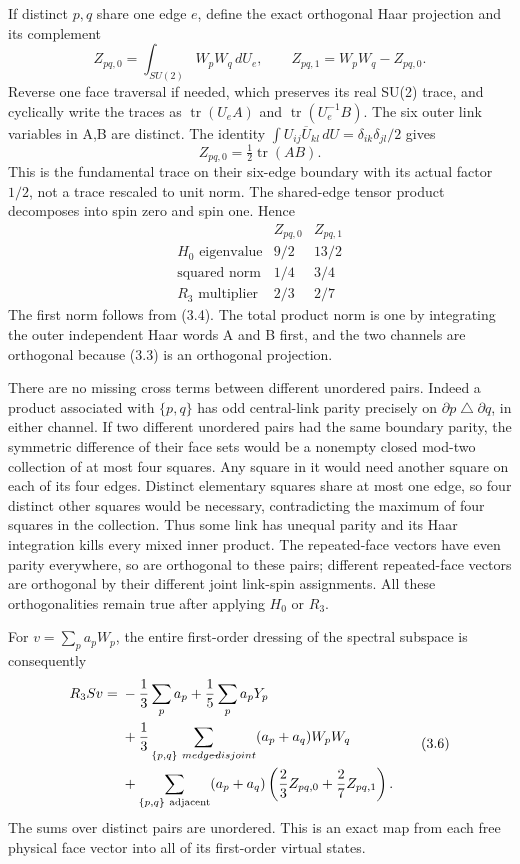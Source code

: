 \documentclass[
  11pt,
]{article}
\begin{document}
If distinct \(p,q\) share one edge \(e\), define the exact orthogonal
Haar projection and its complement \[
 Z_{pq,0}=\int_{SU(2)}W_pW_q\,dU_e,\qquad
 Z_{pq,1}=W_pW_q-Z_{pq,0}.
\tag{3.3}
\] Reverse one face traversal if needed, which preserves its real SU(2)
trace, and cyclically write the traces as \(\operatorname{tr}(U_eA)\)
and \(\operatorname{tr}(U_e^{-1}B)\). The six outer link variables in
A,B are distinct. The identity
\(\int U_{ij}\overline U_{kl}\,dU=\delta_{ik}\delta_{jl}/2\) gives \[
 Z_{pq,0}=\tfrac12\operatorname{tr}(AB).
\tag{3.4}
\] This is the fundamental trace on their six-edge boundary with its
actual factor \(1/2\), not a trace rescaled to unit norm. The
shared-edge tensor product decomposes into spin zero and spin one. Hence
\[
 \begin{array}{c|cc}
 &Z_{pq,0}&Z_{pq,1}\\ \hline
 H_0\text{ eigenvalue}&9/2&13/2\\
 \text{squared norm}&1/4&3/4\\
 R_3\text{ multiplier}&2/3&2/7
 \end{array}
\tag{3.5}
\] The first norm follows from (3.4). The total product norm is one by
integrating the outer independent Haar words A and B first, and the two
channels are orthogonal because (3.3) is an orthogonal projection.

There are no missing cross terms between different unordered pairs.
Indeed a product associated with \(\{p,q\}\) has odd central-link parity
precisely on \(\partial p\mathbin\triangle\partial q\), in either
channel. If two different unordered pairs had the same boundary parity,
the symmetric difference of their face sets would be a nonempty closed
mod-two collection of at most four squares. Any square in it would need
another square on each of its four edges. Distinct elementary squares
share at most one edge, so four distinct other squares would be
necessary, contradicting the maximum of four squares in the collection.
Thus some link has unequal parity and its Haar integration kills every
mixed inner product. The repeated-face vectors have even parity
everywhere, so are orthogonal to these pairs; different repeated-face
vectors are orthogonal by their different joint link-spin assignments.
All these orthogonalities remain true after applying \(H_0\) or \(R_3\).

For \(v=\sum_pa_pW_p\), the entire first-order dressing of the spectral
subspace is consequently \[
 \begin{split}
 R_3Sv={}&-\frac13\sum_pa_p
 +\frac15\sum_pa_pY_p\\
 &+\frac13\sum_{\{p,q\}\ {m edge\!\!-\!\!disjoint}}
                      (a_p+a_q)W_pW_q\\
 &+\sum_{\{p,q\}\ {\rm adjacent}}(a_p+a_q)
                  \left(\frac23Z_{pq,0}+\frac27Z_{pq,1}\right).
 \end{split}
\tag{3.6}
\] The sums over distinct pairs are unordered. This is an exact map from
each free physical face vector into all of its first-order virtual
states.
\end{document}
